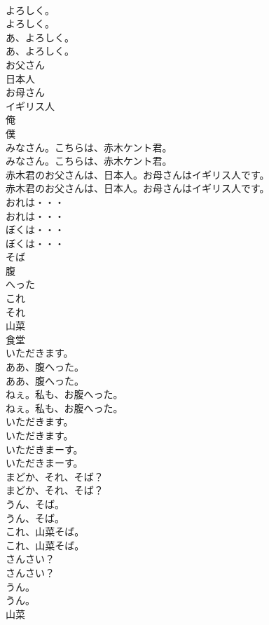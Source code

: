 \documentclass[8pt]{extreport}
\begin{document}
\begin{CJK}{UTF8}{min}
\\	よろしく。	
\\	よろしく。 
\\	あ、よろしく。	
\\	あ、よろしく。 
\\	お父さん
\\	日本人
\\	お母さん
\\	イギリス人
\\	俺
\\	僕
\\	みなさん。こちらは、赤木ケント君。	
\\	みなさん。こちらは、赤木ケント君。 
\\	赤木君のお父さんは、日本人。お母さんはイギリス人です。	
\\	赤木君のお父さんは、日本人。お母さんはイギリス人です。 
\\	おれは・・・	
\\	おれは・・・ 
\\	ぼくは・・・	
\\	ぼくは・・・ 
\\	そば
\\	腹
\\	へった
\\	これ
\\	それ
\\	山菜
\\	食堂
\\	いただきます。
\\	ああ、腹へった。	
\\	ああ、腹へった。 
\\	ねぇ。私も、お腹へった。	
\\	ねぇ。私も、お腹へった。 
\\	いただきます。	
\\	いただきます。 
\\	いただきまーす。	
\\	いただきまーす。 
\\	まどか、それ、そば？	
\\	まどか、それ、そば？ 
\\	うん、そば。	
\\	うん、そば。 
\\	これ、山菜そば。	
\\	これ、山菜そば。 
\\	さんさい？	
\\	さんさい？ 
\\	うん。	
\\	うん。 
\\	山菜

\end{CJK}
\end{document}
